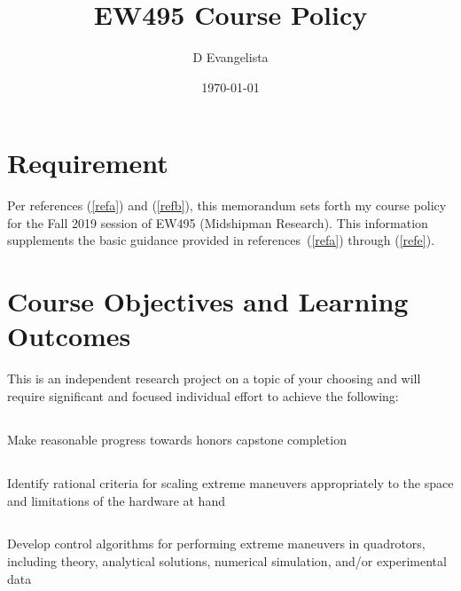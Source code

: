 \documentclass[10pt,courier]{navymemo}
\author{D Evangelista}
\title{EW495 Course Policy}
\date{\today}
\begin{document}
\makedateblock{}

\MEMORANDUM{}

\begin{navyletterheader}
\navyskip{}%

\navysubjline{}
\navyskip{}%
\end{navyletterheader}

\section{Requirement}
Per references (\ref{refa}) and (\ref{refb}), this memorandum sets forth my course policy for the Fall 2019 session of EW495 (Midshipman Research).  This information supplements the basic guidance provided in references~(\ref{refa}) through (\ref{refe}). 

\section{Course Objectives and Learning Outcomes}  This is an independent research project on a topic of your choosing and will require significant and focused individual effort to achieve the following:
\subsection{} Make reasonable progress towards honors capstone completion
\subsection{} Identify rational criteria for scaling extreme maneuvers appropriately to the space and limitations of the hardware at hand
\subsection{} Develop control algorithms for performing extreme maneuvers in quadrotors, including theory, analytical solutions, numerical simulation, and/or experimental data
\end{document}
